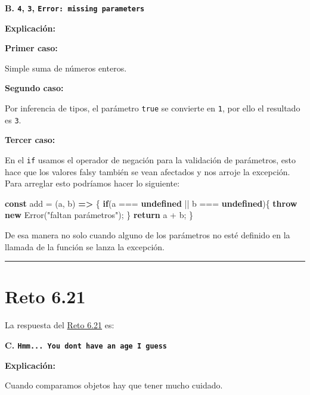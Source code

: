 \documentclass[
  letterpaper,
  DIV=11,
  numbers=noendperiod]{scrreprt}
\newenvironment{Shaded}{\begin{snugshade}}{\end{snugshade}}
\newcommand{\BuiltInTok}[1]{\textcolor[rgb]{0.00,0.23,0.31}{#1}}
\newcommand{\ControlFlowTok}[1]{\textcolor[rgb]{0.00,0.23,0.31}{\textbf{#1}}}
\newcommand{\KeywordTok}[1]{\textcolor[rgb]{0.00,0.23,0.31}{\textbf{#1}}}
\newcommand{\NormalTok}[1]{\textcolor[rgb]{0.00,0.23,0.31}{#1}}
\newcommand{\OperatorTok}[1]{\textcolor[rgb]{0.37,0.37,0.37}{#1}}
\newcommand{\StringTok}[1]{\textcolor[rgb]{0.13,0.47,0.30}{#1}}
\begin{document}
\textbf{B. \texttt{4}, \texttt{3}, \texttt{Error:\ missing\ parameters}}

\textbf{Explicación:}

\textbf{Primer caso:}

Simple suma de números enteros.

\textbf{Segundo caso:}

Por inferencia de tipos, el parámetro \texttt{true} se convierte en
\texttt{1}, por ello el resultado es \texttt{3}.

\textbf{Tercer caso:}

En el \texttt{if} usamos el operador de negación para la validación de
parámetros, esto hace que los valores falsy también se vean afectados y
nos arroje la excepción. Para arreglar esto podríamos hacer lo
siguiente:

\begin{Shaded}
\begin{Highlighting}[]
\KeywordTok{const}\NormalTok{ add }\OperatorTok{=}\NormalTok{ (a}\OperatorTok{,}\NormalTok{ b) }\KeywordTok{=\textgreater{}}\NormalTok{ \{}
  \ControlFlowTok{if}\NormalTok{(a }\OperatorTok{===} \KeywordTok{undefined} \OperatorTok{||}\NormalTok{ b }\OperatorTok{===} \KeywordTok{undefined}\NormalTok{)\{}
    \ControlFlowTok{throw} \KeywordTok{new} \BuiltInTok{Error}\NormalTok{(}\StringTok{"faltan parámetros"}\NormalTok{)}\OperatorTok{;}
\NormalTok{  \}}
  \ControlFlowTok{return}\NormalTok{ a }\OperatorTok{+}\NormalTok{ b}\OperatorTok{;}
\NormalTok{\}}
\end{Highlighting}
\end{Shaded}

De esa manera no solo cuando alguno de los parámetros no esté definido
en la llamada de la función se lanza la excepción.

\begin{center}\rule{0.5\linewidth}{0.5pt}\end{center}

\section{Reto 6.21}\label{sec-sol-cap6-reto21}

La respuesta del \hyperref[sec-cap6-reto21]{Reto 6.21} es:

\textbf{C.
\texttt{Hmm...\ You\ don\textquotesingle{}t\ have\ an\ age\ I\ guess}}

\textbf{Explicación:}

Cuando comparamos objetos hay que tener mucho cuidado.
\end{document}
